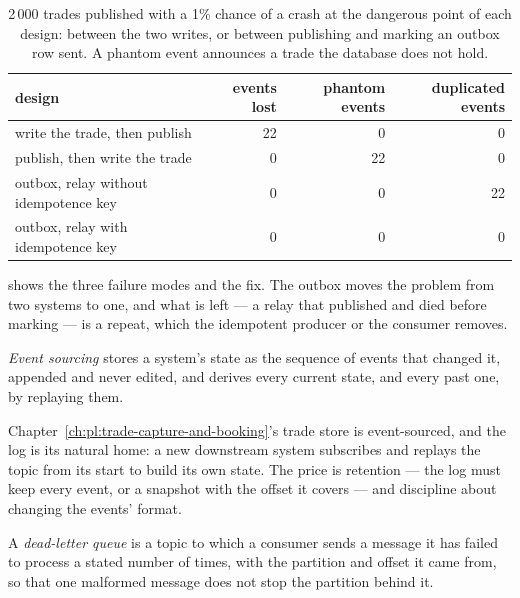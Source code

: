 \label{lst:pl:messaging-and-event-driven-architecture:outbox}

\begin{table}[htbp]
\centering\small
\begin{tabular}{lrrr}
\toprule
design & events lost & phantom events & duplicated events\\
\midrule
write the trade, then publish & 22 & 0 & 0\\
publish, then write the trade & 0 & 22 & 0\\
outbox, relay without idempotence key & 0 & 0 & 22\\
outbox, relay with idempotence key & 0 & 0 & 0\\
\bottomrule
\end{tabular}
\caption{2\,000 trades published with a 1\% chance of a crash at the dangerous point of each design: between the two writes, or between
publishing and marking an outbox row sent. A phantom event announces a trade the database does not hold.}
\label{tab:pl:messaging-and-event-driven-architecture:outbox}
\end{table}

 shows the three failure modes and the fix. The outbox moves the problem from
two systems to one, and what is left --- a relay that published and died before marking --- is a repeat, which the idempotent producer or
the consumer removes.

\begin{definition}\label{def:pl:messaging-and-event-driven-architecture:sourcing}
\emph{Event sourcing} stores a system's state as the sequence of events that changed it, appended and never edited, and
derives every current state, and every past one, by replaying them.
\end{definition}

Chapter~\ref{ch:pl:trade-capture-and-booking}'s trade store is event-sourced, and the log is its natural home: a new downstream system
subscribes and replays the topic from its start to build its own state. The price is retention --- the log must keep every event, or a
snapshot with the offset it covers --- and discipline about changing the events' format.

\begin{definition}\label{def:pl:messaging-and-event-driven-architecture:dlq}
A \emph{dead-letter queue} is a topic to which a consumer sends a message it has failed to process a stated number of
times, with the partition and offset it came from, so that one malformed message does not stop the partition behind it.
\end{definition}

